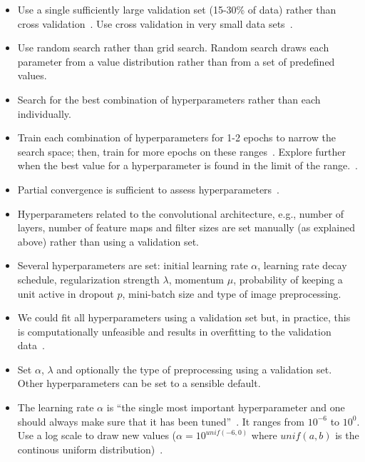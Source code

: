 \begin{itemize}
	\item Use a single sufficiently large validation set (15-30\% of data) rather than cross validation~\cite{Bengio2014}. Use cross validation in very small data sets~\cite{Ng2014}.

	\item Use random search rather than grid search. Random search draws each parameter from a value distribution rather than from a set of predefined values.~\cite{Bergstra2012}

	\item Search for the best combination of hyperparameters rather than each individually.

	\item Train each combination of hyperparameters for 1-2 epochs to narrow the search space; then, train for more epochs on these ranges~\cite{Karpathy2015}. Explore further when the best value for a hyperparameter is found in the limit of the range.~\cite{Bengio2012}.

	\item Partial convergence is sufficient to assess hyperparameters~\cite{Karpathy2015}.

	\item Hyperparameters related to the convolutional architecture, e.g., number of layers, number of feature maps and filter sizes are set manually (as explained above) rather than using a validation set.

	\item Several hyperparameters are set: initial learning rate $\alpha$, learning rate decay schedule, regularization strength $\lambda$, momentum $\mu$, probability of keeping a unit active in dropout $p$, mini-batch size and type of image preprocessing.

	\item We could fit all hyperparameters using a validation set but, in practice, this is computationally unfeasible and results in overfitting to the validation data~\cite{Cawley2010}.

	\item Set $\alpha$, $\lambda$ and optionally the type of preprocessing using a validation set. Other hyperparameters can be set to a sensible default. 

	\item The learning rate $\alpha$ is ``the single most important hyperparameter and one should always make sure that it has been tuned''~\cite{Bengio2012}. It ranges from $10^{-6}$ to $10^{0}$. Use a log scale to draw new values ($\alpha = 10^{unif(-6, 0)}$ where $unif(a,b)$ is the continous uniform distribution)~\cite{Karpathy2015}.


\end{itemize}
